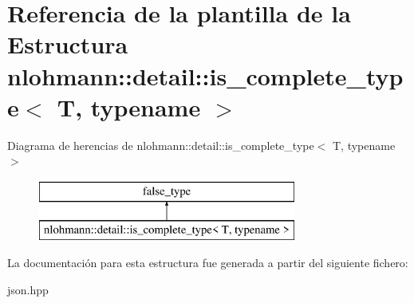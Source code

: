 \hypertarget{structnlohmann_1_1detail_1_1is__complete__type}{}\section{Referencia de la plantilla de la Estructura nlohmann\+:\+:detail\+:\+:is\+\_\+complete\+\_\+type$<$ T, typename $>$}
\label{structnlohmann_1_1detail_1_1is__complete__type}
Diagrama de herencias de nlohmann\+:\+:detail\+:\+:is\+\_\+complete\+\_\+type$<$ T, typename $>$\begin{figure}[H]
\begin{center}
\leavevmode
\includegraphics[height=2.000000cm]{structnlohmann_1_1detail_1_1is__complete__type}
\end{center}
\end{figure}


La documentación para esta estructura fue generada a partir del siguiente fichero\+:\begin{DoxyCompactItemize}
\item 
json.\+hpp\end{DoxyCompactItemize}
